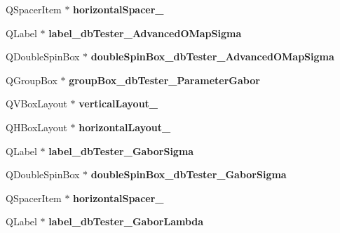 \begin{DoxyCompactItemize}
\item 
\mbox{\label{class_ui___main_window_ad977263554f6a5b422f205fe349c84e4}} 
Q\+Spacer\+Item $\ast$ {\bfseries horizontal\+Spacer\+\_}
\item 
\mbox{\label{class_ui___main_window_a65f1e8c5338ffc9342f9da9fa0e86b32}} 
Q\+Label $\ast$ {\bfseries label\+\_\+db\+Tester\+\_\+\+Advanced\+O\+Map\+Sigma}
\item 
\mbox{\label{class_ui___main_window_ab994d5e4476c79bb58046739625a48c2}} 
Q\+Double\+Spin\+Box $\ast$ {\bfseries double\+Spin\+Box\+\_\+db\+Tester\+\_\+\+Advanced\+O\+Map\+Sigma}
\item 
\mbox{\label{class_ui___main_window_a55afe807ed3f390dbded457f304f0de7}} 
Q\+Group\+Box $\ast$ {\bfseries group\+Box\+\_\+db\+Tester\+\_\+\+Parameter\+Gabor}
\item 
\mbox{\label{class_ui___main_window_a8c0fa94a03ca882ed9ce2f44a8058158}} 
Q\+V\+Box\+Layout $\ast$ {\bfseries vertical\+Layout\+\_}
\item 
\mbox{\label{class_ui___main_window_ace90ad79d857a577478bfb093959b3d6}} 
Q\+H\+Box\+Layout $\ast$ {\bfseries horizontal\+Layout\+\_}
\item 
\mbox{\label{class_ui___main_window_ae8bbd58f30bebb55916563844f101eea}} 
Q\+Label $\ast$ {\bfseries label\+\_\+db\+Tester\+\_\+\+Gabor\+Sigma}
\item 
\mbox{\label{class_ui___main_window_a36003b11c2d98b803464389dc126814b}} 
Q\+Double\+Spin\+Box $\ast$ {\bfseries double\+Spin\+Box\+\_\+db\+Tester\+\_\+\+Gabor\+Sigma}
\item 
\mbox{\label{class_ui___main_window_ab84715d8a46fd81ff73f6e13de103cae}} 
Q\+Spacer\+Item $\ast$ {\bfseries horizontal\+Spacer\+\_}
\item 
\mbox{\label{class_ui___main_window_a4592716515282b96d6453d5ed763c55b}} 
Q\+Label $\ast$ {\bfseries label\+\_\+db\+Tester\+\_\+\+Gabor\+Lambda}

\end{DoxyCompactItemize}
